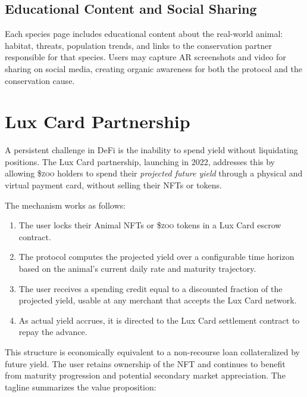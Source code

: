 \documentclass[11pt,letterpaper]{article}
\newcommand{\ZOO}{\$\textsc{zoo}}
\begin{document}
\subsection{Educational Content and Social Sharing}

Each species page includes educational content about the real-world animal: habitat,
threats, population trends, and links to the conservation partner responsible for
that species.  Users may capture AR screenshots and video for sharing on social media,
creating organic awareness for both the protocol and the conservation cause.

\section{Lux Card Partnership}
\label{sec:luxcard}

A persistent challenge in DeFi is the inability to spend yield without liquidating
positions.  The Lux Card partnership, launching in 2022, addresses this by allowing
\ZOO{} holders to spend their \emph{projected future yield} through a physical and
virtual payment card, without selling their NFTs or tokens.

The mechanism works as follows:

\begin{enumerate}
    \item The user locks their Animal NFTs or \ZOO{} tokens in a Lux Card escrow
          contract.
    \item The protocol computes the projected yield over a configurable time horizon
          based on the animal's current daily rate and maturity trajectory.
    \item The user receives a spending credit equal to a discounted fraction of the
          projected yield, usable at any merchant that accepts the Lux Card network.
    \item As actual yield accrues, it is directed to the Lux Card settlement contract
          to repay the advance.
\end{enumerate}

This structure is economically equivalent to a non-recourse loan collateralized by
future yield.  The user retains ownership of the NFT and continues to benefit from
maturity progression and potential secondary market appreciation.  The tagline
summarizes the value proposition:
\end{document}
